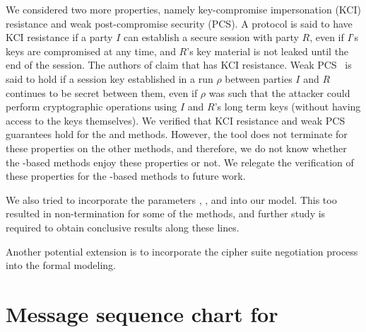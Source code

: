 \documentclass[runningheads, envcountsame, hidelinks, a4paper, draft, x11names]{llncs}
\begin{document}
We considered two more properties, namely key-compromise impersonation (KCI) resistance and weak post-compromise security (PCS). A protocol is said to have KCI resistance if a party $I$ can establish a secure session with party $R$, even if $I$'s keys are compromised at any time, and $R$'s key material is not leaked until the end of the session. The authors of \mSpec{} claim that \mEdhoc{} has KCI resistance. Weak PCS~\cite{cohn2016post} is said to hold if a session key established in a run $\rho$ between parties $I$ and $R$ continues to be secret between them, even if $\rho$ was such that the attacker could perform cryptographic operations using $I$ and $R$'s long term keys (without having access to the keys themselves). We verified that KCI resistance and weak PCS guarantees hold for the \mSigSig{} and \mPskPsk{} methods.
However, the tool does not terminate for these properties on the other methods, and therefore, we do not know whether the \mStat-based methods enjoy these properties or not. We relegate the verification of these properties for the \mStat-based methods to future work. 

We also tried to incorporate the parameters \mCi, \mCr, and \mAD{} into our model. This too resulted in non-termination for some of the methods, and further study is required to obtain conclusive results along these lines. 

Another potential extension is to incorporate the cipher suite negotiation process into the formal modeling.\\ 
%

%





\appendix

\section{Message sequence chart for \mStatSig}\label{sec:mscstatsig}
\end{document}
